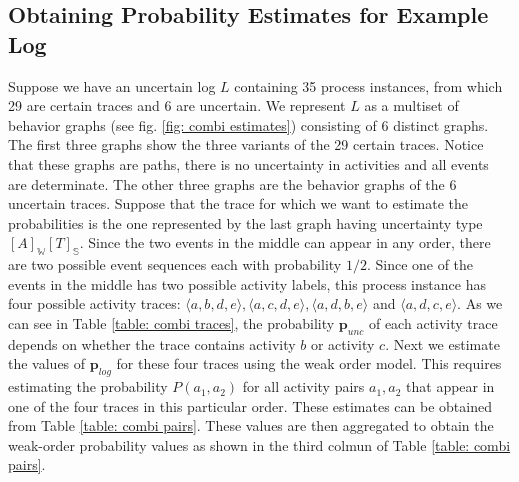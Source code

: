 \subsection{Obtaining Probability Estimates for Example Log}
Suppose we have an uncertain log $L$ containing 35 process instances, from which 29 are certain traces and 6 are uncertain.
We represent $L$ as a multiset of behavior graphs \cite{space} (see fig. \ref{fig: combi estimates}) consisting of 6 distinct graphs.
The first three graphs show the three variants of the 29 certain traces.
Notice that these graphs are paths, there is no uncertainty in activities and all events are determinate.
The other three graphs are the behavior graphs of the 6 uncertain traces.
Suppose that the trace for which we want to estimate the probabilities is the one represented by the last graph having uncertainty type $[A]_{\mathbb{W}}[T]_{\mathbb{S}}$.
Since the two events in the middle can appear in any order, there are two possible event sequences each with probability $1/2$.
Since one of the events in the middle has two possible activity labels, this process instance has four possible activity traces:
$\langle a,b,d,e\rangle, \langle a,c,d,e\rangle, \langle a,d,b,e\rangle$ and $\langle a,d,c,e\rangle$.
As we can see in Table \ref{table: combi traces}, the probability $\textbf{p}_{unc}$ of each activity trace depends on whether the trace contains activity $b$ or activity $c$.
Next we estimate the values of $\textbf{p}_{log}$ for these four traces using the weak order model.
This requires estimating the probability $P(a_1,a_2)$ for all activity pairs $a_1,a_2$ that appear in one of the four traces in this particular order.
These estimates can be obtained from Table \ref{table: combi pairs}.
These values are then aggregated to obtain the weak-order probability values as shown in the third colmun of Table \ref{table: combi pairs}.
%
%
%
%
%
